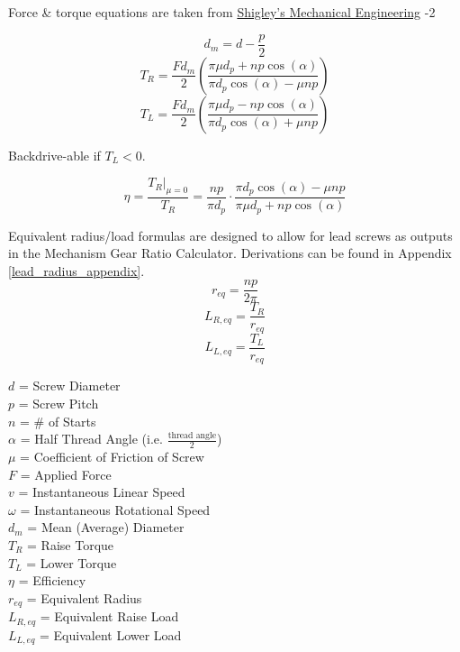\documentclass[11pt,a4paper,titlepage]{article}
\begin{document}
	Force \& torque equations are taken from \href{https://fac.ksu.edu.sa/sites/default/files/mechanical-disgin-shigley.pdf}{Shigley's Mechanical Engineering} -2
	
	\begin{equation}
	d_m = d - \frac{p}{2}
	\end{equation}
	\begin{equation}
	T_R = \frac{F d_m}{2} \left( \frac{\pi \mu d_p + n p \cos(\alpha)}{\pi d_p \cos(\alpha) - \mu n p} \right)
	\end{equation}
	\begin{equation}
	T_L = \frac{F d_m}{2} \left( \frac{\pi \mu d_p - n p \cos(\alpha)}{\pi d_p \cos(\alpha) + \mu n p} \right)
	\end{equation}
	\begin{center}
		Backdrive-able if $T_L < 0$.
	\end{center}
	\begin{equation}
	\eta = \frac{T_R |_{\mu=0}}{T_R} = \frac{n p}{\pi d_p} \cdot \frac{\pi d_p \cos(\alpha) - \mu n p}{\pi \mu d_p + n p \cos(\alpha)}
	\end{equation}
	
	Equivalent radius/load formulas are designed to allow for lead screws as outputs in the Mechanism Gear Ratio Calculator. Derivations can be found in Appendix \ref{lead_radius_appendix}.
	\begin{equation} \label{r_eq}
	r_{eq} = \frac{n p}{2 \pi}
	\end{equation}
	\begin{equation}
	L_{R,eq} = \frac{T_R}{r_{eq}}
	\end{equation}
	\begin{equation}
	L_{L,eq} = \frac{T_L}{r_{eq}}
	\end{equation}
	\bigskip
	
	$d$ = Screw Diameter \\
	$p$ = Screw Pitch \\
	$n$ = \# of Starts \\
	$\alpha$ = Half Thread Angle (i.e. $\frac{\text{thread angle}}{2}$) \\
	$\mu$ = Coefficient of Friction of Screw \\
	$F$ = Applied Force \\
	$v$ = Instantaneous Linear Speed \\
	$\omega$ = Instantaneous Rotational Speed \\
	$d_m$ = Mean (Average) Diameter \\
	$T_R$ = Raise Torque \\
	$T_L$ = Lower Torque \\
	$\eta$ = Efficiency \\
	$r_{eq}$ = Equivalent Radius \\
	$L_{R,eq}$ = Equivalent Raise Load \\
	$L_{L,eq}$ = Equivalent Lower Load
	
\end{document}
